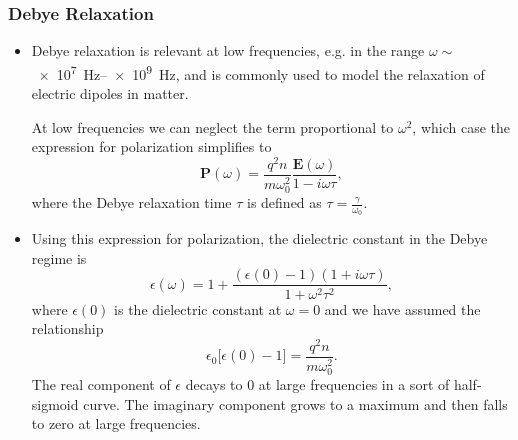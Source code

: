 \documentclass[11pt, a4paper]{article}
\renewcommand{\vec}[1]{\bm{#1}} %
\newcommand{\E}{\vec{E}} %
\renewcommand{\P}{\vec{P}}  %
\newcommand{\ee}{\epsilon_{0}}  %
\begin{document}
\subsubsection{Debye Relaxation}
\begin{itemize}
    \item Debye relaxation is relevant at low frequencies, e.g. in the range $ \omega \sim $ \SIrange{e7}{e9}{\hertz}, and is commonly used to model the relaxation of electric dipoles in matter.

    At low frequencies we can neglect the term proportional to $ \omega^{2} $, which case the expression for polarization simplifies to
    \begin{equation*}
        \P(\omega) = \frac{q^{2}n}{m\omega_{0}^{2}} \frac{\E(\omega)}{1 - i\omega\tau},
    \end{equation*}
    where the Debye relaxation time $ \tau $ is defined as $ \tau = \frac{\gamma}{\omega_{0}} $.
    
    \item Using this expression for polarization, the dielectric constant in the Debye regime is
    \begin{equation*}
        \epsilon(\omega) = 1 + \frac{(\epsilon(0) -1)(1 + i\omega\tau)}{1 + \omega^{2}\tau^{2}},
    \end{equation*}
    where $ \epsilon(0) $ is the dielectric constant at $ \omega = 0 $ and we have assumed the relationship
    \begin{equation*}
        \ee \big[ \epsilon(0) -1 \big] = \frac{q^{2}n}{m\omega_{0}^{2}}.
    \end{equation*}
    The real component of $ \epsilon $ decays to 0 at large frequencies in a sort of half-sigmoid curve. The imaginary component grows to a maximum and then falls to zero at large frequencies.
\end{itemize}
\end{document}
